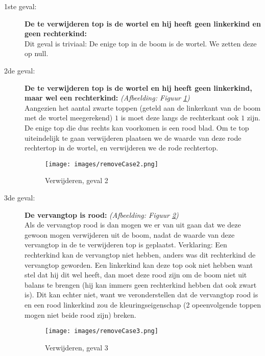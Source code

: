 \documentclass[11pt,a4paper]{report}
\begin{document}
\begin{description}
\item[1ste geval:]
\textbf{De te verwijderen top is de wortel en hij heeft geen linkerkind en geen rechterkind:}\\
Dit geval is triviaal: De enige top in de boom is de wortel. We zetten deze op null.

\item[2de geval:]
\textbf{De te verwijderen top is de wortel en hij heeft geen linkerkind, maar wel een rechterkind:} \textsl{(Afbeelding: Figuur \ref{removeCase2})} \\
Aangezien het aantal zwarte toppen (geteld aan de linkerkant van de boom met de wortel meegerekend) $1$ is moet deze langs de rechterkant ook $1$ zijn. De enige top die dus rechts kan voorkomen is een rood blad. Om te top uiteindelijk te gaan verwijderen plaatsen we de waarde van deze rode rechtertop in de wortel, en verwijderen we de rode rechtertop.
\begin{figure}[h!]
	\centering
		\texttt{[image: images/removeCase2.png]}
	\caption{Verwijderen, geval 2}
	\label{removeCase2}
\end{figure}

\item[3de geval:]
\textbf{De vervangtop is rood:} \textsl{(Afbeelding: Figuur \ref{removeCase3})}\\
Als de vervangtop rood is dan mogen we er van uit gaan dat we deze gewoon mogen verwijderen uit de boom, nadat de waarde van deze vervangtop in de te verwijderen top is geplaatst. Verklaring: Een rechterkind kan de vervangtop niet hebben, anders was dit rechterkind de vervangtop geworden. Een linkerkind kan deze top ook niet hebben want stel dat hij dit wel heeft, dan moet deze rood zijn om de boom niet uit balans te brengen (hij kan immers geen rechterkind hebben dat ook zwart is). Dit kan echter niet, want we veronderstellen dat de vervangtop rood is en een rood linkerkind zou de kleuringseigenschap (2 opeenvolgende toppen mogen niet beide rood zijn) breken.
\begin{figure}[h!]
	\centering
		\texttt{[image: images/removeCase3.png]}
	\caption{Verwijderen, geval 3}
	\label{removeCase3}
\end{figure}


\end{description}
\end{document}
